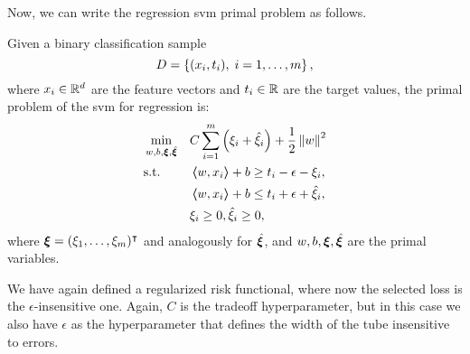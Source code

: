 Now, we can write the regression \acrshort{svm} primal problem as follows.
\begin{definition}
    Given a binary classification sample
    $$ D = \left\{(x_i, t_i), \; i=1, \ldots, m\right\} ,$$
    where $x_i \in \mathbb{R}^d$ are the feature vectors and $t_i \in \mathbb{R}$ are the target values, 
    the primal problem of the \acrshort{svm} for regression is:
    \begin{equation}
        \label{eq:linear_primal_reg}
        \begin{aligned}
            &\min_{w, b, \fv{\xi}, \hat{\fv{\xi}}} & & C \sum_{i=1}^m \left(\xi_i + \hat{\xi}_i\right) + \frac{1}{2} \norm{w}^2 \\
            & \text{s.t.} & & \dotp{w}{x_i} + b \geq t_i - \epsilon - \xi_i  , \\
            & & & \dotp{w}{x_i} + b \leq t_i + \epsilon + \hat{\xi}_i , \\
            & & & \xi_i \geq 0 , \hat{\xi}_i \geq 0 ,      
        \end{aligned}  
    \end{equation}
    where $\bm{\xi} = (\xi_1, \ldots, \xi_m)^\intercal$ and analogously for $\hat{\bm{\xi}}$, and $w, b, \bm{\xi}, \hat{\bm{\xi}}$ are the primal variables.
\end{definition}
We have again defined a regularized risk functional, where now the selected loss is the $\epsilon$-insensitive one. Again, $C$ is the tradeoff hyperparameter, but in this case we also have $\epsilon$ as the hyperparameter that defines the width of the tube insensitive to errors.

